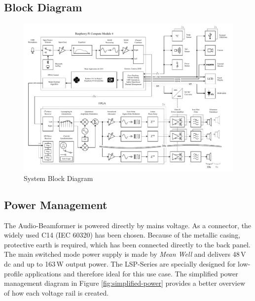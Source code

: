 \subsection{Block Diagram}
\begin{figure}[h!]
	\centering
	\includegraphics[width=21.5cm, angle=90]{images/4_Design/Hardware/System Block Diagram 2.pdf}
	\vspace{-0.2cm}
    \caption{System Block Diagram}
    \label{fig:hardware-block-diagram}
\end{figure}

\clearpage
\subsection{Power Management}
The Audio-Beamformer is powered directly by mains voltage. As a connector, the widely used C14 (IEC 60320) has been chosen. Because of the metallic casing, protective earth is required, which has been connected directly to the back panel. The main switched mode power supply is made by \textit{Mean Well} and delivers 48\,V \acrshort{dc} and up to 163\,W output power. The LSP-Series are specially designed for low-profile applications and therefore ideal for this use case.\newline
The simplified power management diagram in Figure \ref{fig:simplified-power} provides a better overview of how each voltage rail is created.

